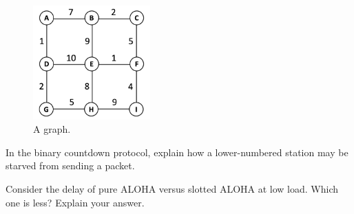 \begin{figure}
    \centering
    \includegraphics[width=0.4\textwidth]{images/graph.png}
    \caption{A graph.}
    \label{fig:graph}
\end{figure}

\question In the binary countdown protocol, explain how a lower-numbered station may be starved from sending a packet.

\question Consider the delay of pure ALOHA versus slotted ALOHA at low load.
Which one is less? Explain your answer.
